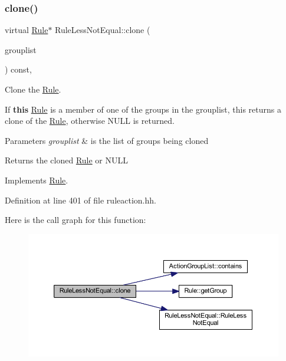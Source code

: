 \subsubsection{\texorpdfstring{clone()}{clone()}}
{\footnotesize\ttfamily virtual \mbox{\hyperlink{class_rule}{Rule}}$\ast$ Rule\+Less\+Not\+Equal\+::clone (\begin{DoxyParamCaption}\item[{const \mbox{\hyperlink{class_action_group_list}{Action\+Group\+List}} \&}]{grouplist }\end{DoxyParamCaption}) const\hspace{0.3cm}{\ttfamily [inline]}, {\ttfamily [virtual]}}



Clone the \mbox{\hyperlink{class_rule}{Rule}}. 

If {\bfseries{this}} \mbox{\hyperlink{class_rule}{Rule}} is a member of one of the groups in the grouplist, this returns a clone of the \mbox{\hyperlink{class_rule}{Rule}}, otherwise N\+U\+LL is returned. 
\begin{DoxyParams}{Parameters}
{\em grouplist} & is the list of groups being cloned \\
\hline
\end{DoxyParams}
\begin{DoxyReturn}{Returns}
the cloned \mbox{\hyperlink{class_rule}{Rule}} or N\+U\+LL 
\end{DoxyReturn}


Implements \mbox{\hyperlink{class_rule_a70de90a76461bfa7ea0b575ce3c11e4d}{Rule}}.



Definition at line 401 of file ruleaction.\+hh.

Here is the call graph for this function\+:
\nopagebreak
\begin{figure}[H]
\begin{center}
\leavevmode
\includegraphics[width=350pt]{class_rule_less_not_equal_a8e163306125fbd3f7c5f507ef84cc4d4_cgraph}
\end{center}
\end{figure}
\mbox{\label{class_rule_less_not_equal_aa260561402061a7c93f711be9ab7f284}} 

